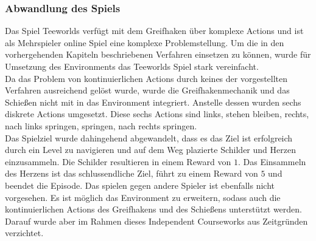 \documentclass[11pt]{scrartcl}
\begin{document}
\subsubsection{Abwandlung des Spiels}
Das Spiel Teeworlds verfügt mit dem Greifhaken über komplexe Actions und ist als
Mehrspieler online Spiel eine komplexe Problemstellung. Um die in den vorhergehenden
Kapiteln beschriebenen Verfahren einsetzen zu können, wurde für Umsetzung des Environments
das Teeworlds Spiel stark vereinfacht.\\
Da das Problem von kontinuierlichen Actions durch keines der vorgestellten Verfahren
ausreichend gelöst wurde, wurde die Greifhakenmechanik und das Schießen nicht mit in das
Environment integriert. Anstelle dessen wurden sechs diskrete Actions umgesetzt. Diese
sechs Actions sind \grqq links\grqq, \grqq stehen bleiben\grqq, \grqq rechts\grqq, \grqq
nach links springen\grqq, \grqq springen\grqq, \grqq nach rechts springen\grqq.\\
Das Spielziel wurde dahingehend abgewandelt, dass es das Ziel ist erfolgreich durch ein
Level zu navigieren und auf dem Weg plazierte Schilder und Herzen einzusammeln. Die
Schilder resultieren in einem Reward von $1$. Das Einsammeln des Herzens ist das
schlussendliche Ziel, führt zu einem Reward von $5$ und beendet die Episode. Das spielen
gegen andere Spieler ist ebenfalls nicht vorgesehen. Es ist möglich das Environment zu
erweitern, sodass auch die kontinuierlichen Actions des Greifhakens und des Schießens
unterstützt werden. Darauf wurde aber im Rahmen dieses Independent Courseworks aus
Zeitgründen verzichtet.
\end{document}
